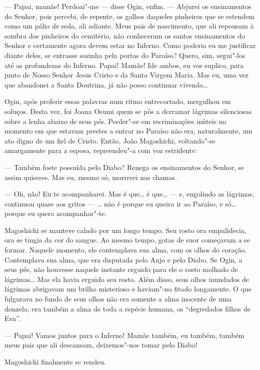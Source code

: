 --- Papai, mamãe! Perdoai"-me --- disse Ogin, enfim. --- Abjurei os
ensinamentos do Senhor, pois percebi, de repente, os galhos daqueles
pinheiros que se estendem como um pálio de seda, ali adiante. Meus pais
de nascimento, que ali repousam à sombra dos pinheiros do cemitério,
não conheceram os santos ensinamentos do Senhor e certamente agora
devem estar no Inferno. Como poderia eu me justificar diante deles, se
entrasse sozinha pela portas do Paraíso? Quero, sim, segui"-los até as
profundezas do Inferno. Papai! Mamãe! Ide ambos, eu vos suplico, para
junto de Nosso Senhor Jesus Cristo e da Santa Virgem Maria. Mas eu, uma
vez que abandonei a Santa Doutrina, já não posso continuar vivendo\ldots{}

Ogin, após proferir essas palavras num ritmo entrecortado, mergulhou em
soluços. Desta vez, foi Joana Osumi quem se pôs a derramar lágrimas
silenciosas sobre a lenha abaixo de seus pés. Perder"-se em
recriminações inúteis no momento em que estavam prestes a entrar no
Paraíso não era, naturalmente, um ato digno de um fiel de Cristo.
Então, João Magoshichi, voltando"-se amargamente para a esposa,
repreendeu"-a com voz estridente:

--- Também foste possuída pelo Diabo? Renega os ensinamentos do Senhor, se
assim quiseres. Mas eu, mesmo só, morrerei nas chamas.

--- Oh, não! Eu te acompanharei. Mas é que\ldots{} é que\ldots{} --- e, engolindo as
lágrimas, continuou quase aos gritos --- \ldots{} não é porque eu queira ir ao
Paraíso, e só\ldots{} porque eu quero acompanhar"-te.

Magoshichi se manteve calado por um longo tempo. Seu rosto ora
empalidecia, ora se tingia da cor do sangue. Ao mesmo tempo, gotas de
suor começavam a se formar. Naquele momento, ele contemplava sua alma,
com os olhos do coração. Contemplava sua alma, que era disputada pelo
Anjo e pelo Diabo. Se Ogin, a seus pés, não houvesse naquele instante
erguido para ele o rosto molhado de lágrimas\ldots{} Mas ela havia erguido
seu rosto. Além disso, seus olhos inundados de lágrimas abrigavam um
brilho misterioso e haviam"-no fitado longamente. O que fulgurava no
fundo de seus olhos não era somente a alma inocente de uma donzela, era
também a alma de toda a espécie humana, os ``degredados filhos de Eva''.

--- Papai! Vamos juntos para o Inferno! Mamãe também, eu também, também 
meus pais que ali descansam, deixemos"-nos tomar pelo Diabo!

Magoshichi finalmente se rendeu.

